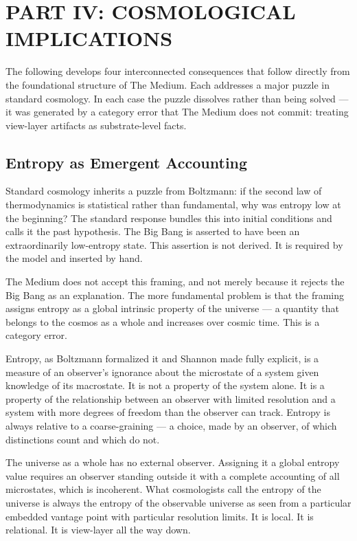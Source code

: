\documentclass[11pt,letterpaper]{article}
\begin{document}
\section{PART IV: COSMOLOGICAL IMPLICATIONS}
\label{sec:org7f00323}

The following develops four interconnected consequences that follow directly from the foundational structure of The Medium. Each addresses a major puzzle in standard cosmology. In each case the puzzle dissolves rather than being solved --- it was generated by a category error that The Medium does not commit: treating view-layer artifacts as substrate-level facts.

\subsection{Entropy as Emergent Accounting}
\label{sec:orgaf71bcc}

Standard cosmology inherits a puzzle from Boltzmann: if the second law of thermodynamics is statistical rather than fundamental, why was entropy low at the beginning? The standard response bundles this into initial conditions and calls it the past hypothesis. The Big Bang is asserted to have been an extraordinarily low-entropy state. This assertion is not derived. It is required by the model and inserted by hand.

The Medium does not accept this framing, and not merely because it rejects the Big Bang as an explanation. The more fundamental problem is that the framing assigns entropy as a global intrinsic property of the universe --- a quantity that belongs to the cosmos as a whole and increases over cosmic time. This is a category error.

Entropy, as Boltzmann formalized it and Shannon made fully explicit, is a measure of an observer's ignorance about the microstate of a system given knowledge of its macrostate. It is not a property of the system alone. It is a property of the relationship between an observer with limited resolution and a system with more degrees of freedom than the observer can track. Entropy is always relative to a coarse-graining --- a choice, made by an observer, of which distinctions count and which do not.

The universe as a whole has no external observer. Assigning it a global entropy value requires an observer standing outside it with a complete accounting of all microstates, which is incoherent. What cosmologists call the entropy of the universe is always the entropy of the observable universe as seen from a particular embedded vantage point with particular resolution limits. It is local. It is relational. It is view-layer all the way down.
\end{document}
